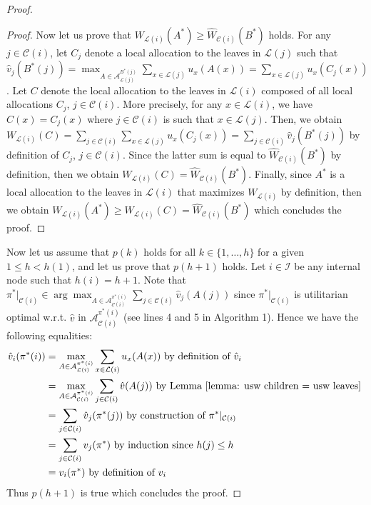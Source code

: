 \documentclass[]{article}
\newcommand{\children}{\mathcal{C}}
\newcommand{\leaves}{\mathcal{L}}
\newcommand{\internal}{\mathcal{I}}
\newcommand{\allocations}{\mathcal{A}}
\begin{document}
\begin{proof}
\begin{proof}
Now let us prove that $W_{\leaves(i)}(A^*) \geq \hat{W}_{\children(i)}(B^*)$ holds. For any $j\in \children(i)$, let $C_j$ denote a local allocation to the leaves in $\leaves(j)$ such that $\hat{v}_j(B^*(j)) = \max_{A \in \allocations^{B^*(j)}_{\leaves(j)}} \sum_{x \in \leaves(j)} u_x(A(x)) = \sum_{x \in \leaves(j)} u_x(C_j(x))$. Let $C$ denote the local allocation to the leaves in $\leaves(i)$ composed of all local allocations $C_j$, $j\in \children(i)$. More precisely, for any $x\in \leaves(i)$, we have $C(x) = C_{j}(x)$ where $j \in \children(i)$ is such that $x \in \leaves(j)$. Then, we obtain $W_{\leaves(i)}(C) = \sum_{j \in \children(i)} \sum_{x \in \leaves(j)} u_x(C_j(x)) = \sum_{j \in \children(i)} \hat{v}_j(B^*(j))$ by definition of  $C_j$, $j\in \children(i)$. Since the latter sum is equal to $\hat{W}_{\children(i)}(B^*)$ by definition, then we obtain $W_{\leaves(i)}(C) = \hat{W}_{\children(i)}(B^*)$. Finally, since $A^*$ is a local allocation to the leaves in $\leaves(i)$ that maximizes $W_{\leaves(i)}$ by definition, then we obtain $W_{\leaves(i)}(A^*) \ge W_{\leaves(i)}(C)=\hat{W}_{\children(i)}(B^*)$ which concludes the proof.
\end{proof}


Now let us assume that $p(k)$ holds for all $k \in \{1,\ldots,h\}$ for a given $1 \le h < h(1)$, and let us prove that $p(h+1)$ holds. Let $i \in \internal$ be any internal node such that $h(i)=h+1$. Note that $\pi^*\vert_{\children(i)} \in \arg \max_{A \in \allocations^{\pi^*(i)}_{\children(i)}} \sum_{j \in \children(i)} \hat{v}_j(A(j))$ since $\pi^*\vert_{\children(i)}$ is utilitarian optimal w.r.t. $\hat{v}$ in $\allocations^{\pi^*(i)}_{\children(i)}$ (see lines 4 and 5 in Algorithm 1). Hence we have the following equalities: 
\begin{align*}
   \hat{v}_i(\pi^*(i))  &=\max_{A \in \allocations^{\pi^*(i)}_{\leaves(i)}} \sum_{x \in \leaves(i)} u_x(A(x)) \mbox{ by definition of }\hat{v}_i\\
     & = \max_{A \in \allocations^{\pi^*(i)}_{\children(i)}} \sum_{j \in \children(i)} \hat{v}(A(j)) \mbox{ by Lemma~\ref{lemma: usw children = usw leaves} }\\
    & = \sum_{j \in \children(i)} \hat{v}_j(\pi^*(j)) \mbox{ by construction of }\pi^*|_{\children(i)} \\
    & = \sum_{j \in \children(i)} v_j(\pi^*) \mbox{ by induction since } h(j) \le h\\
    & = v_i(\pi^*) \mbox{ by definition of }v_i
\end{align*}
Thus $p(h+1)$ is true which concludes the proof. 
\end{proof}
\end{document}
